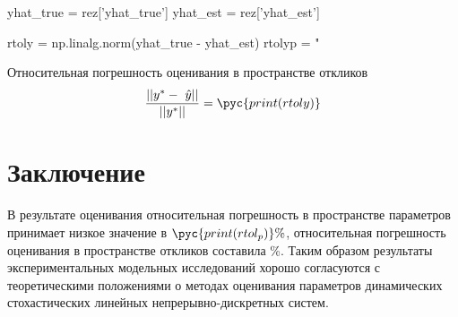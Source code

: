 \documentclass[a4paper,14pt]{extarticle}
\begin{document}
\begin{pycode}
yhat_true = rez['yhat_true']
yhat_est = rez['yhat_est']

rtoly = np.linalg.norm(yhat_true - yhat_est)
rtolyp = "%
\end{pycode}

Относительная погрешность оценивания в пространстве откликов
\[
	\frac{||y^{*} -\ \hat{y}||}{|| y^{*} ||} = \pyc{print(rtoly)}
\]

\section*{Заключение}

В результате оценивания относительная погрешность в пространстве параметров
принимает низкое значение в $\pyc{print(rtol_p)}\%$, относительная погрешность
оценивания в пространстве откликов составила \%. Таким
образом результаты экспериментальных модельных исследований хорошо согласуются
с теоретическими положениями о методах оценивания параметров динамических
стохастических линейных непрерывно-дискретных систем.
\end{document}
